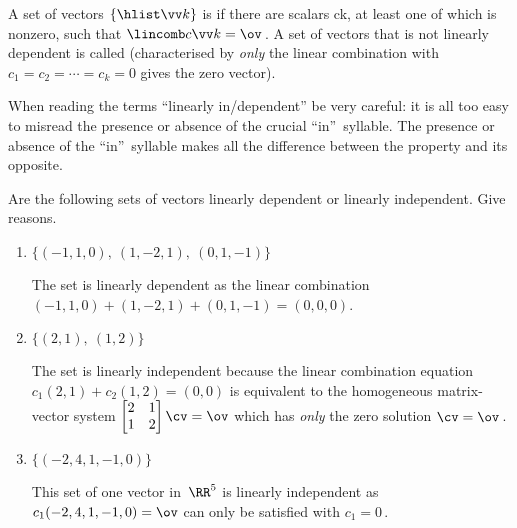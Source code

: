 \begin{definition} \label{def:lindep} 
A set of vectors \(\{\hlist\vv k\}\) is  if there are scalars \hlist ck, at least one of which is nonzero, such that \(\lincomb c\vv k=\ov\)\,.
A set of vectors that is not linearly dependent is called  (characterised by \emph{only} the linear combination with \(c_1=c_2=\cdots=c_k=0\) gives the zero vector).
\end{definition}

When reading the terms ``linearly in/dependent'' be very careful: it is all too easy to misread the presence or absence of the crucial ``in''~syllable. 
The presence or absence of the ``in''~syllable makes all the difference between the property and its opposite.


\begin{example} \label{eg:lindep}
Are the following sets of vectors linearly dependent or linearly independent.  Give reasons.
\begin{enumerate}
\item\label{eg:lindepa} \(\{(-1,1,0),\ (1,-2,1),\ (0,1,-1)\}\) 
\begin{solution} 
The set is linearly dependent as the linear combination \((-1,1,0)+(1,-2,1)+(0,1,-1)=(0,0,0)\). 
\end{solution}

\item\label{eg:lindepb} \(\{(2,1),\ (1,2)\}\) 
\begin{solution} 
The set is linearly independent because the linear combination equation \(c_1(2,1)+c_2(1,2)=(0,0)\) is equivalent to the homogeneous matrix-vector system \(\begin{bmatrix} 2&1\\1&2 \end{bmatrix}\cv=\ov\) which has \emph{only} the zero solution \(\cv=\ov\)\,. 
\end{solution}


\item\label{eg:lindepc} \(\{(-2,4,1,-1,0)\}\)
\begin{solution} 
This set of one vector in~\(\RR^5\) is linearly independent as \(c_1(-2,4,1,-1,0)=\ov\) can only be satisfied with \(c_1=0\)\,. 


\end{solution}
\end{enumerate}
\end{example}
